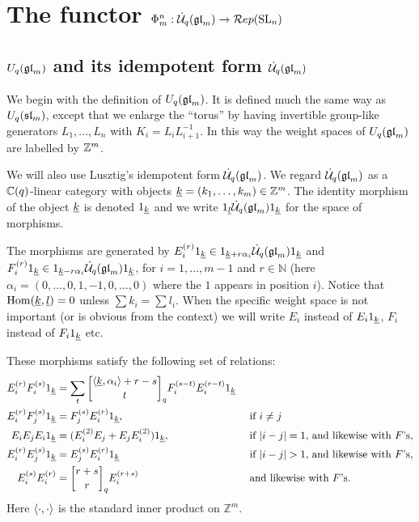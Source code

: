 \documentclass[11pt]{amsart}
\begin{document}
\section{The functor \texorpdfstring{$\Phi_m^n:\dU(\gl_m) \rightarrow \Rep(\SL_n)$}{Phi}}\label{sec:phi}

\subsection{\texorpdfstring{$ U_q(\gl_m)$}{U\_q gl\_m} and its idempotent form \texorpdfstring{$\dU(\gl_m)$}{}}\label{sec:idemform}

We begin with the definition of $ U_q(\gl_m)$.  It is defined much the same way as $ U_q(\sl_m) $, except that we enlarge the ``torus'' by having invertible group-like generators $ L_1, \dots, L_n $ with $ K_i = L_i L_{i+1}^{-1} $.  In this way the weight spaces of $ U_q(\gl_m) $ are labelled by $ \bZ^m $.

We will also use Lusztig's idempotent form $ \dU(\gl_m) $. We regard $\dU(\gl_m)$ as a $\bC(q)$-linear category with objects $ \ul{k} = (k_1, \dots, k_m) \in \mathbb Z^m $.  The identity morphism of the object $\ul{k}$ is denoted $\one_\ul{k}$  and we write $ \one_\ul{l} \dU(\gl_m) \one_\ul{k}$ for the space of morphisms.

The morphisms are generated by $E_i^{(r)} \one_{\ul{k}} \in \one_{\ul{k} + r \alpha_i} \dU(\gl_m) \one_{\ul{k}} $ and $ F_i^{(r)} \one_{\ul{k}} \in \one_{\ul{k} - r \alpha_i} \dU(\gl_m) \one_{\ul{k}}$, for $i=1, \dots, m-1$ and $r \in {\mathbb N}$ (here $\alpha_i = (0,\dots,0,1,-1,0,\dots,0)$ where the $1$ appears in position $i$). Notice that $\Hom(\ul{k}, \ul{l}) = 0 $ unless $\sum k_i = \sum l_i$. When the specific weight space is not important (or is obvious from the context) we will write $E_i$ instead of $E_i \one_{\ul{k}}$, $F_i$ instead of $F_i \one_{\ul{k}}$ etc.

These morphisms satisfy the following set of relations:
\begin{align}
\label{rel:1}
E_i^{(r)} F_i^{(s)} \one_{\ul{k}} &= \sum_t \qBinomial{\la \ul{k}, \alpha_i \ra + r - s}{t} F_i^{(s-t)} E_i^{(r-t)} \one_{\ul{k}} & & \\
\label{rel:2}  E_i^{(r)} F_j^{(s)} \one_{\ul{k}} &= F_j^{(s)} E_i^{(r)} \one_{\ul{k}}, & & \text{ if $i \ne j$} \\
\label{rel:3} E_iE_jE_i \one_{\ul{k}} &= (E_i^{(2)} E_j + E_j E_i^{(2)}) \one_{\ul{k}}, && \text{ if $ |i - j| = 1 $, and likewise with $F$'s,} \\
\label{rel:4} E_i^{(r)} E_j^{(s)} \one_{\ul{k}} &= E_j^{(s)} E_i^{(r)} \one_{\ul{k}} &&\text{ if $ |i-j| > 1$, and likewise with $F$'s,} \\
\label{rel:5} E_i^{(s)} E_i^{(r)} &= \qBinomial{r+s}{r} E_i^{(r+s)} && \text{ and likewise with $F$'s.}
\end{align}
Here $\la \cdot, \cdot \ra$ is the standard inner product on $\mathbb Z^m$.
\end{document}
